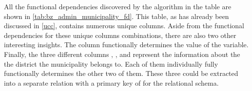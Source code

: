 All the functional dependencies discovered by the algorithm in the  table are shown in \cref{tab:bz_admin_municipality_fd}. This table, as has already been discussed in \cref{ucc}, contains numerous unique columns.
Aside from the functional dependencies for these unique columns combinations, there are also two other interesting insights.
The column  functionally determines the value of the  variable.
Finally, the three different columns , , and  represent the information about the the district the municipality belongs to. Each of them individually fully functionally determines the other two of them. These three could be extracted into a separate relation with a primary key of  for the relational schema.

